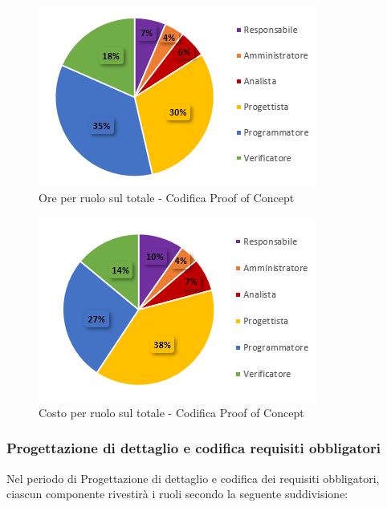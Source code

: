 \begin{figure}[H]
  \centering
  \includegraphics[scale=1]{immagini/ore_ruolo_PoC.png}
  \caption{Ore per ruolo sul totale - Codifica Proof of Concept}
\end{figure}

\begin{figure}[H]
  \centering
  \includegraphics[scale=1]{immagini/costo_ruolo_PoC.png}
  \caption{Costo per ruolo sul totale - Codifica Proof of Concept}
\end{figure}


\subsubsection{Progettazione di dettaglio e codifica requisiti obbligatori}
Nel periodo di Progettazione di dettaglio e codifica dei requisiti obbligatori, ciascun componente rivestirà i ruoli secondo la seguente suddivisione:

